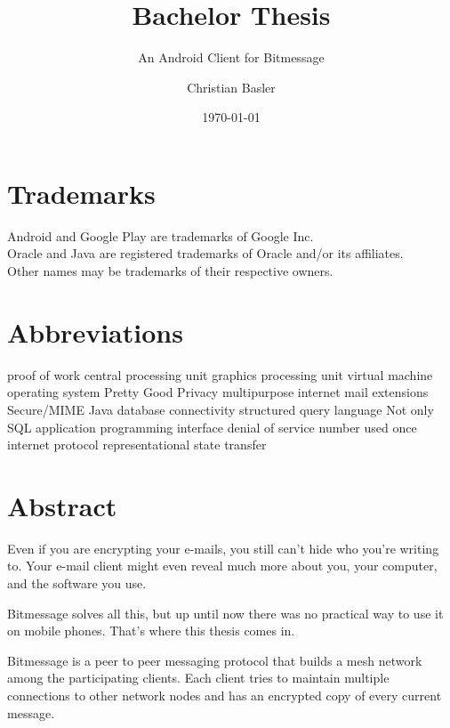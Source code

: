 \documentclass{bfh}
\title{Bachelor Thesis}
\subtitle{An Android Client for Bitmessage}
\author{Christian Basler}
\date{\today}
\begin{document}
  \lstset{language=Java}
  \maketitle

  \section*{Trademarks}
  Android and Google Play are trademarks of Google Inc.\\
  Oracle and Java are registered trademarks of Oracle and/or its affiliates.\\
  Other names may be trademarks of their respective owners.

  \section*{Abbreviations}
  \begin{acronym}[S/MIME ]
        {proof of work}
        {central processing unit}
        {graphics processing unit}
         {virtual machine}
         {operating system}
        {Pretty Good Privacy}
       {multipurpose internet mail extensions}
     {Secure/\acs{MIME}}
       {Java database connectivity}
        {structured query language}
      {Not only \acs{SQL}}
        {application programming interface}
        {denial of service}
      {number used once}
         {internet protocol}
       {representational state transfer}
  \end{acronym}


  \newpage
  \section*{Abstract}
  Even if you are encrypting your e-mails, you still can't hide who you're writing to. Your e-mail client might even reveal much more about you, your computer, and the software you use.

  Bitmessage solves all this, but up until now there was no practical way to use it on mobile phones. That's where this thesis comes in.


  Bitmessage is a peer to peer messaging protocol that builds a mesh network among the participating clients. Each client tries to maintain multiple connections to other network nodes and has an encrypted copy of every current message.
\end{document}
